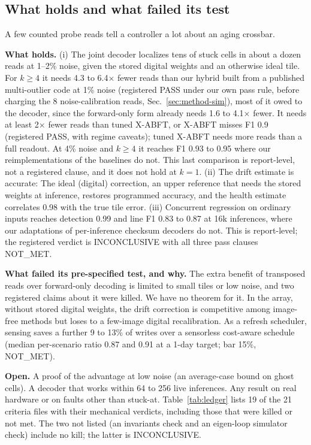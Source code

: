 \documentclass[journal]{IEEEtran}
\begin{document}
\subsection{What holds and what failed its test}
A few counted probe reads tell a controller a lot about an aging crossbar.

\textbf{What holds.}
(i) The joint decoder localizes tens of stuck cells in about a dozen reads at 1--2\% noise, given the stored digital weights and an otherwise ideal tile. For $k\ge4$ it needs 4.3 to 6.4$\times$ fewer reads than our hybrid built from a published multi-outlier code at 1\% noise (registered PASS under our own pass rule, before charging the 8 noise-calibration reads, Sec.~\ref{sec:method-sim}), most of it owed to the decoder, since the forward-only form already needs 1.6 to 4.1$\times$ fewer. It needs at least 2$\times$ fewer reads than tuned X-ABFT, or X-ABFT misses F1 0.9 (registered PASS, with regime caveats); tuned X-ABFT needs more reads than a full readout. At 4\% noise and $k\ge4$ it reaches F1 0.93 to 0.95 where our reimplementations of the baselines do not. This last comparison is report-level, not a registered clause, and it does not hold at $k=1$.
(ii) The drift estimate is accurate:  The ideal (digital) correction, an upper reference that needs the stored weights at inference, restores programmed accuracy, and the health estimate correlates 0.98 with the true tile error.
(iii) Concurrent regression on ordinary inputs reaches detection 0.99 and line F1 0.83 to 0.87 at 16k inferences, where our adaptations of per-inference checksum decoders do not. This is report-level; the registered verdict is INCONCLUSIVE with all three pass clauses NOT\_MET.

\textbf{What failed its pre-specified test, and why.}
The extra benefit of transposed reads over forward-only decoding is limited to small tiles or low noise, and two registered claims about it were killed. We have no theorem for it. In the array, without stored digital weights, the drift correction is competitive among image-free methods but loses to a few-image digital recalibration. As a refresh scheduler, sensing saves a further 9 to 13\% of writes over a sensorless cost-aware schedule (median per-scenario ratio 0.87 and 0.91 at a 1-day target; bar 15\%, NOT\_MET).

\textbf{Open.} A proof of the advantage at low noise (an average-case bound on ghost cells). A decoder that works within 64 to 256 live inferences. Any result on real hardware or on faults other than stuck-at.
Table~\ref{tab:ledger} lists 19 of the 21 criteria files with their mechanical verdicts, including those that were killed or not met. The two not listed (an invariants check and an eigen-loop simulator check) include no kill; the latter is INCONCLUSIVE.
\end{document}
